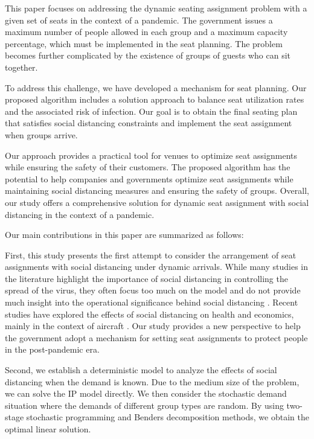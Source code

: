 This paper focuses on addressing the dynamic seating assignment problem with a given set of seats in the context of a pandemic. The government issues a maximum number of people allowed in each group and a maximum capacity percentage, which must be implemented in the seat planning. The problem becomes further complicated by the existence of groups of guests who can sit together.

To address this challenge, we have developed a mechanism for seat planning. Our proposed algorithm includes a solution approach to balance seat utilization rates and the associated risk of infection. Our goal is to obtain the final seating plan that satisfies social distancing constraints and implement the seat assignment when groups arrive.

Our approach provides a practical tool for venues to optimize seat assignments while ensuring the safety of their customers. The proposed algorithm has the potential to help companies and governments optimize seat assignments while maintaining social distancing measures and ensuring the safety of groups. Overall, our study offers a comprehensive solution for dynamic seat assignment with social distancing in the context of a pandemic.


Our main contributions in this paper are summarized as follows:

First, this study presents the first attempt to consider the arrangement of seat assignments with social distancing under dynamic arrivals. While many studies in the literature highlight the importance of social distancing in controlling the spread of the virus, they often focus too much on the model and do not provide much insight into the operational significance behind social distancing \cite{barry2021optimal, fischetti2021safe}. Recent studies have explored the effects of social distancing on health and economics, mainly in the context of aircraft \cite{salari2020social, ghorbani2020model, salari2022social}. Our study provides a new perspective to help the government adopt a mechanism for setting seat assignments to protect people in the post-pandemic era.

Second, we establish a deterministic model to analyze the effects of social distancing when the demand is known. Due to the medium size of the problem, we can solve the IP model directly. We then consider the stochastic demand situation where the demands of different group types are random. By using two-stage stochastic programming and Benders decomposition methods, we obtain the optimal linear solution.

